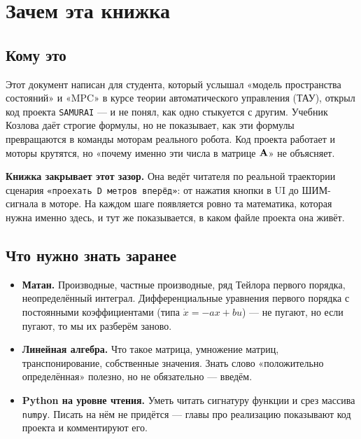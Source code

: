 \chapter{Зачем эта книжка}
\label{ch:intro}

\section{Кому это}

Этот документ написан для студента, который услышал «модель пространства
состояний» и «MPC» в курсе теории автоматического управления (ТАУ),
открыл код проекта \texttt{SAMURAI} --- и не понял, как одно стыкуется
с другим. Учебник Козлова даёт строгие формулы, но не показывает, как
эти формулы превращаются в команды моторам реального робота. Код проекта
работает и моторы крутятся, но «почему именно эти числа в матрице $\mathbf{A}$»
не объясняет.

\textbf{Книжка закрывает этот зазор.} Она ведёт читателя по реальной траектории
сценария \texttt{«проехать D метров вперёд»}: от нажатия кнопки в UI до
ШИМ-сигнала в моторе. На каждом шаге появляется ровно та математика,
которая нужна именно здесь, и тут же показывается, в каком файле проекта
она живёт.

\section{Что нужно знать заранее}

\begin{itemize}
  \item \textbf{Матан.} Производные, частные производные, ряд Тейлора первого
        порядка, неопределённый интеграл. Дифференциальные уравнения первого
        порядка с постоянными коэффициентами (типа $\dot{x} = -ax + bu$) ---
        не пугают, но если пугают, то мы их разберём заново.
  \item \textbf{Линейная алгебра.} Что такое матрица, умножение матриц,
        транспонирование, собственные значения. Знать слово «положительно
        определённая» полезно, но не обязательно --- введём.
  \item \textbf{Python на уровне чтения.} Уметь читать сигнатуру функции
        и срез массива \texttt{numpy}. Писать на нём не придётся ---
        главы про реализацию показывают код проекта и комментируют его.
\end{itemize}

